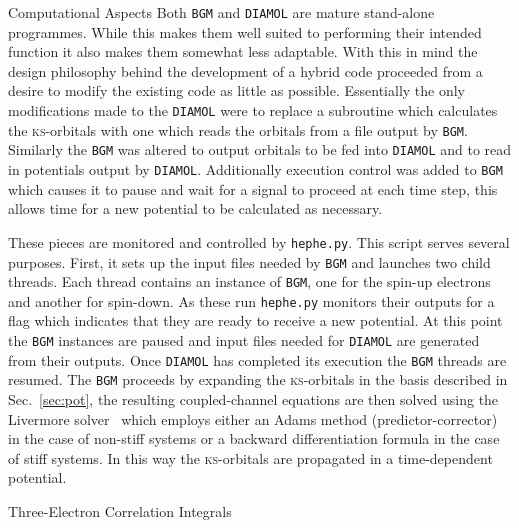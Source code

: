 \documentclass[a5paper, 9 pt]{extreport}
\begin{document}
\begin{appendices}
\begin{chapter}{Computational Aspects \label{chap:calcdeets}}
      Both \texttt{BGM} and \texttt{DIAMOL} are mature stand-alone programmes. While this makes them
      well suited to performing their intended function it also makes them somewhat less adaptable. With
      this in mind the design philosophy behind the development of a hybrid code proceeded from a desire
      to modify the existing code as little as possible. Essentially the only modifications made to the
      \texttt{DIAMOL} were to replace a subroutine which calculates the \textsc{ks}-orbitals with one
      which reads the orbitals from a file output by \texttt{BGM}. Similarly the \texttt{BGM} was
      altered to output orbitals to be fed into \texttt{DIAMOL} and to read in potentials output by
      \texttt{DIAMOL}. Additionally execution control was added to \texttt{BGM} which causes it to pause
      and wait for a signal to proceed at each time step, this allows time for a new potential to be
      calculated as necessary.

      These pieces are monitored and controlled by \texttt{hephe.py}. This script serves several
      purposes. First, it sets up the input files needed by \texttt{BGM} and launches two child threads.
      Each thread contains an instance of \texttt{BGM}, one for the spin-up electrons and another for
      spin-down. As these run \texttt{hephe.py} monitors their outputs for a flag which indicates that
      they are ready to receive a new potential. At this point the \texttt{BGM} instances are paused
      and input files needed for \texttt{DIAMOL} are generated from their outputs. Once \texttt{DIAMOL}
      has completed its execution the \texttt{BGM} threads are resumed. The \texttt{BGM} proceeds by
      expanding the \textsc{ks}-orbitals in the basis described in Sec.~\ref{sec:pot}, the resulting
      coupled-channel equations are then solved using the Livermore solver~\cite{dlsode1, dlsode2} which
      employs either an Adams method (predictor-corrector) in the case of non-stiff systems or a backward
      differentiation formula in the case of stiff systems. In this way the \textsc{ks}-orbitals are
      propagated in a time-dependent potential.

   \end{chapter}

   \begin{chapter}{Three-Electron Correlation Integrals \label{chap:moreIc}}


\end{chapter}
\end{appendices}
\end{document}
